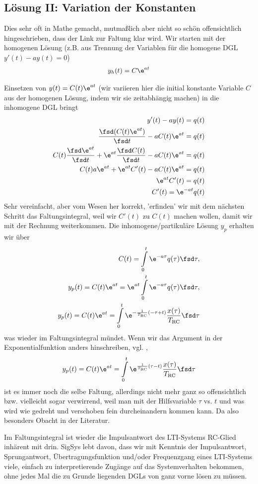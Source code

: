 \subsection*{Lösung II: Variation der Konstanten}
Dies sehr oft in Mathe gemacht, mutmaßlich aber nicht so schön offensichtlich hingeschrieben, dass der Link zur Faltung klar wird.
%
Wir starten mit der homogenen Lösung (z.B. aus Trennung der Variablen für die homogene DGL $y'(t) - a y(t) = 0$)
\begin{align}
y_h(t) = C \e^{a t}
\end{align}

Einsetzen von $y(t) = C(t) \e^{a t}$ (wir variieren hier die initial konstante Variable $C$ aus der homogenen Lösung, indem wir sie zeitabhängig machen) in die inhomogene DGL bringt
\begin{align}
y'(t) - a y(t) = q(t)\\
\frac{\fsd (C(t) \e^{a t})}{\fsd t} - a C(t) \e^{a t} = q(t)\\
C(t) \frac{\fsd \e^{a t}}{\fsd t} + \e^{a t} \frac{\fsd C(t)}{\fsd t} - a C(t) \e^{a t} = q(t)\\
C(t) a \e^{a t} + \e^{a t} C'(t) - a C(t) \e^{a t} = q(t)\\
\e^{a t} C'(t) = q(t)\\
C'(t) = \e^{-a t} q(t)
\end{align}
Sehr vereinfacht, aber vom Wesen her korrekt, 'erfinden' wir mit dem nächsten Schritt das Faltungsintegral, weil wir $C'(t)$ zu $C(t)$ machen wollen, damit wir mit der Rechnung weiterkommen.
Die inhomogene/partikuläre Lösung $y_p$ erhalten wir über
\begin{align}
C(t) = \int\limits_{0}^{t} \e^{-a \tau} q(\tau) \fsd\tau,\\
y_p(t) = C(t) \e^{a t} = \e^{a t}\int\limits_{0}^{t} \e^{-a \tau} q(\tau) \fsd\tau,\\
y_p(t) = C(t) \e^{a t} = \int\limits_{0}^{t} \e^{-\frac{1}{\TRC} (-\tau+t)} \frac{x(\tau)}{\TRC} \fsd\tau
\end{align}
was wieder im Faltungsintegral mündet.
Wenn wir das Argument in der Exponentialfunktion anders hinschreiben, vgl. \cite[Anhang A.2]{Paull2017},
\begin{align}
y_p(t) = C(t) \e^{a t} = \int\limits_{0}^{t} \e^{\frac{1}{\TRC} (\tau-t)} \frac{x(\tau)}{\TRC} \fsd\tau
\end{align}
ist es immer noch die selbe Faltung, allerdings nicht mehr ganz so offensichtlich bzw. vielleicht sogar verwirrend, weil man mit der Hilfsvariable $\tau$ vs. $t$ und was wird wie gedreht und verschoben fein durcheinandern kommen kann. Da also besonders Obacht in der Literatur.
%

Im Faltungsintegral ist wieder die Impulsantwort des LTI-Systems RC-Glied inhärent mit drin.
%
SigSys lebt davon, dass wir mit Kenntnis der Impulsantwort, Sprungantwort, Übertragungsfunktion und/oder Frequenzgang eines LTI-Systems viele, einfach zu interpretierende Zugänge auf das Systemverhalten bekommen, ohne jedes Mal die zu Grunde liegenden DGLs von ganz vorne lösen zu müssen.
